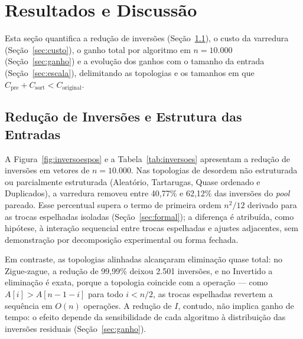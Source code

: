 \documentclass[12pt]{article}
\begin{document}
\section{Resultados e Discussão}\label{sec:res}

Esta seção quantifica a redução de inversões (Seção~\ref{sec:reducao}), o custo da varredura (Seção~\ref{sec:custo}), o ganho total por algoritmo em $n=10.000$ (Seção~\ref{sec:ganho}) e a evolução dos ganhos com o tamanho da entrada (Seção~\ref{sec:escala}), delimitando as topologias e os tamanhos em que $C_{\text{pre}}+C_{\text{sort}}<C_{\text{original}}$.

\subsection{Redução de Inversões e Estrutura das Entradas}\label{sec:reducao}

A Figura~\ref{fig:inversoespos} e a Tabela~\ref{tab:inversoes} apresentam a redução de inversões em vetores de $n=10.000$. Nas topologias de desordem não estruturada ou parcialmente estruturada (Aleatório, Tartarugas, Quase ordenado e Duplicados), a varredura removeu entre 40,77\% e 62,12\% das inversões do \emph{pool} pareado. Esse percentual supera o termo de primeira ordem $n^2/12$ derivado para as trocas espelhadas isoladas (Seção~\ref{sec:formal}); a diferença é atribuída, como hipótese, à interação sequencial entre trocas espelhadas e ajustes adjacentes, sem demonstração por decomposição experimental ou forma fechada.

Em contraste, as topologias alinhadas alcançaram eliminação quase total: no Zigue-zague, a redução de 99,99\% deixou 2.501 inversões, e no Invertido a eliminação é exata, porque a topologia coincide com a operação --- como $A[i] > A[n-1-i]$ para todo $i < n/2$, as trocas espelhadas revertem a sequência em $O(n)$ operações. A redução de $I$, contudo, não implica ganho de tempo: o efeito depende da sensibilidade de cada algoritmo à distribuição das inversões residuais (Seção~\ref{sec:ganho}).
\end{document}
